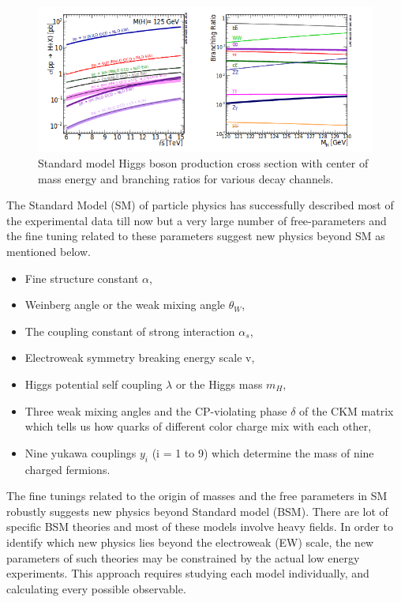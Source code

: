 \documentclass[final,3p]{CSP}
\begin{document}
\begin{figure}[H]
  \centering
   \includegraphics[scale=0.7]{./cd2.png}
  \caption{Standard model Higgs boson production cross section with center of mass energy and branching ratios for various decay channels.}
   \label{figure 3}
\end{figure}
\clearpage

 \newpage

The Standard Model (SM) of particle physics has successfully described most of the experimental data till now but a very large 
number of free-parameters and the fine tuning related to these parameters suggest new physics beyond SM as mentioned below.
\begin{itemize}
\item{Fine structure constant $\alpha$},
\item{Weinberg angle or the weak mixing angle $\theta_W$},
\item{The coupling constant of strong interaction $\alpha_s$},
\item{Electroweak symmetry breaking energy scale v},
\item{ Higgs potential self coupling $\lambda$ or the Higgs mass $m_H$},
\item{Three weak mixing angles and the CP-violating phase $\delta$ of the CKM matrix which tells us how quarks of different color charge mix with each other},
\item{Nine yukawa couplings $y_i$ (i = 1 to 9) which determine the mass of nine charged fermions}.
\end{itemize}
 The fine 
tunings related to the origin of 
masses and the free parameters in SM robustly suggests new physics beyond Standard model (BSM). There are lot of specific 
BSM theories and most of these 
models involve heavy fields. In order to identify which new physics lies beyond the 
electroweak (EW) scale, the new parameters 
of such theories may be constrained by the actual low energy experiments. This approach 
requires studying each model 
individually, and calculating every possible observable.
\end{document}
